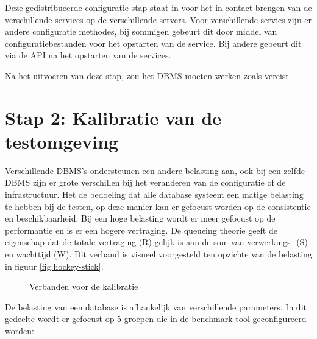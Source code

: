 Deze gedistribueerde configuratie stap staat in voor het in contact brengen van de verschillende services op de verschillende servers. Voor verschillende servics zijn er andere configuratie methodes, bij sommigen gebeurt dit door middel van configuratiebestanden voor het opstarten van de service. Bij andere gebeurt dit via de API na het opstarten van de services. 

Na het uitvoeren van deze stap, zou het DBMS moeten werken zoals vereist. 

\section{Stap 2: Kalibratie van de testomgeving}
Verschillende DBMS's ondersteunen een andere belasting aan, ook bij een zelfde DBMS zijn er grote verschillen bij het veranderen van de configuratie of de infrastructuur. Het de bedoeling dat alle database systeem een matige belasting te hebben bij de testen, op deze manier kan er gefocust worden op de consistentie en beschikbaarheid. Bij een hoge belasting wordt er meer gefocust op de performantie en is er een hogere vertraging. De queueing theorie geeft de eigenschap dat de totale vertraging (R) gelijk is aan de som van verwerkings- (S) en wachttijd (W)\cite{millsap2003optimizing}. Dit verband is visueel voorgesteld ten opzichte van de belasting in figuur \ref{fig:hockey-stick}. 

\begin{figure}[ht!] 
\centering
	\hfill
	\caption{Verbanden voor de kalibratie}
\end{figure}
De belasting van een database is afhankelijk van verschillende parameters. In dit gedeelte wordt er gefocust op 5 groepen die in de benchmark tool geconfigureerd worden:

